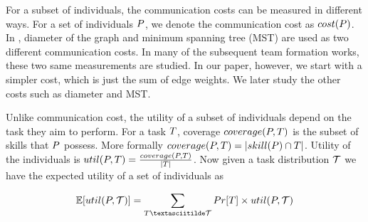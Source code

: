 For a subset of individuals, the communication costs can be measured in different ways. For a set of individuals $P$, we denote the communication cost as $cost(P)$. In \cite{lappas2009finding}, diameter of the graph and minimum spanning tree (MST) are used as two different communication costs. In many of the subsequent team formation works, these two same measurements are studied. In our paper, however, we start with a simpler cost, which is just the sum of edge weights. We later study the other costs such as diameter and MST. 

Unlike communication cost, the utility of a subset of individuals depend on the task they aim to perform. For a task $T$, coverage $coverage(P,T)$ is the subset of skills that $P$ possess. More formally $coverage(P,T) = |skill(P) \cap T|$. Utility of the individuals is ${util}(P,T) = \frac{coverage(P, T)}{|T|}$. Now given a task distribution $\mathcal{T}$ we have the expected utility of a set of individuals as 

$$\mathbb{E}[\util(\persons,\tasks)] = \sum_{\task \textasciitilde \tasks } Pr[\task] \times \util(\persons, \tasks) $$ \\

\begin{comment}
The nodes in graph $\org(\nodes, \edges)$, represented by the set $\nodes = \{\hiredset \cup \candidates\}$, denote the people. As can be seen that it includes the people that are present in the organization already $\hiredset$ and the set of candidates $\candidates$. The edge set of graph $\org$ is denoted by $\edges$. An edge $\edge \in \edges$ is weighted, the weight $\weight(\edge)$ denotes the communication cost between the two people which are the endpoints of $\edge$. We assume the weight of all the edges involving even the candidates are known. 

Further we use the notation $\org_{\nodes'}$ to denote the induced sub graph of $\org$ taken over the node set $\nodes'$.
 



\subsubsection{Utility of an hire}
The utility of the hire depends on the people who are hired and the tasks for which they are hired. Precisely we assume the $\utility(\org_{\nodes'},\task)$ denotes the utility of a node set $\nodes'$, people who are hired, for a task $\task \in \tasks$. The overall utility can then be computed as,
$$\utility(\org_{\nodes'}, \tasks) = \sum_{i} Pr[T_i] \times \utility (\org_{\nodes'}, \task) $$

Given this utility measure, we next proceed to define the expected gain from a possible hire set. Recall $\hireset$ denotes a possible set of hiring. Then the gain of this hire is,
$$\gain(\hireset) = \utility(\org_{\hiredset \cup \hireset},\tasks) - \utility(\org_{\hiredset},\tasks) $$

We are now ready to define our problem of hiring a team that maximizes hiring utility.
\end{comment}

